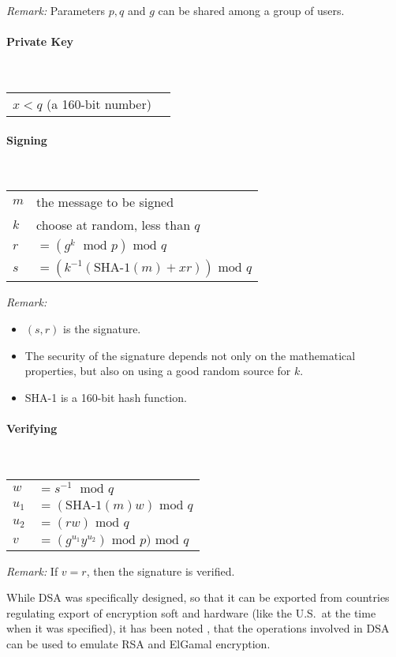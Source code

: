 \emph{Remark:} Parameters $p,q$ and $g$ can be shared among a group of users.

\paragraph{Private Key}\strut\\
\begin{tabular}{l@{ }l}
$x < q$ (a 160-bit number) 
\end{tabular}

\paragraph{Signing}\strut\\
\begin{tabular}{l@{ }l}
$m$ & the message to be signed\\
$k$ & choose at random\index{Random}, less than $q$\\
$r$ & $= (g^k \; \mbox{ mod } p) \mbox{ mod } q$\\
$s$ & $= (k^{-1}(\mbox{SHA-1}(m) + xr)) \mbox{ mod } q$
\end{tabular}

\emph{Remark:}
\begin{itemize}
\item $(s,r)$ is the signature.
\item The security of the signature depends not only on the mathematical
  properties, but also on using a good random source  for $k$.
\item SHA-1  is a 160-bit hash function.
\end{itemize}
\paragraph{Verifying}\strut\\
\begin{tabular}{l@{ }l}
$w$ & $= s^{-1} \;  \mbox{ mod } q$\\
$u_1$ & $= (\mbox{SHA-1}(m)w) \mbox{ mod } q$\\
$u_2$ & $= (rw)  \mbox{ mod } q$\\
$v$ & $= (g^{u_1}y^{u_2}) \mbox{ mod } p)  \mbox{ mod } q$\\

\end{tabular}

\emph{Remark:} If $v = r$, then the signature is verified.

While DSA was specifically designed, so that it can be exported from
countries regulating export of encryption soft and hardware (like the U.S.\ 
at the time when it was specified), it has been noted
\cite[p.~490]{Schneier1996ds}, that the operations involved in DSA can be
used to emulate RSA and ElGamal encryption.


